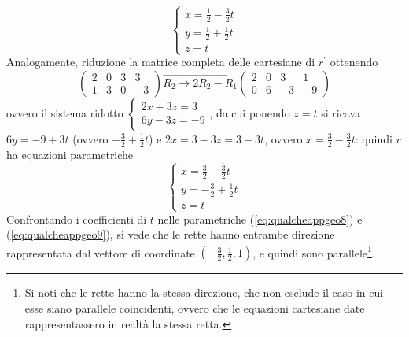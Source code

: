 \begin{oss}
\begin{equation}
    \begin{cases}
      x=\frac{1}{2}-\frac{3}{2}t\\
      y=\frac{1}{2}+\frac{1}{2}t\\
      z=t
    \end{cases}
  \end{equation}
  Analogamente, riduzione la matrice completa delle cartesiane di $r^\prime$ ottenendo
  \begin{equation*}
    \left(
      \begin{array}{ccc|c}
        2 & 0 & 3 & 3 \\
        1 & 3 & 0 & -3
      \end{array}
    \right)\overrightarrow{R_2\to2R_2-R_1}\left(
      \begin{array}{ccc|c}
        2 & 0 & 3 & 1 \\
        0 & 6 & -3 & -9
      \end{array}
    \right)
  \end{equation*}
  ovvero il sistema ridotto $
  \begin{cases}
    2x+3z=3\\
    6y-3z=-9
  \end{cases}
  $, da cui ponendo $z = t$ si ricava $6y=-9+3t$ (ovvero $-\frac{3}{2}+\frac{1}{2}t$) e $2x=3-3z=3-3t$,
  ovvero $x=\frac{3}{2}-\frac{3}{2}t$: quindi $r$ ha equazioni parametriche
  \begin{equation}
    \label{eq:qualcheappgeo9}
    \begin{cases}
      x=\frac{3}{2}-\frac{3}{2}t\\
      y=-\frac{3}{2}+\frac{1}{2}t\\
      z=t
    \end{cases}
  \end{equation}
  Confrontando i coefficienti di $t$ nelle parametriche (\ref{eq:qualcheappgeo8}) e
  (\ref{eq:qualcheappgeo9}), si vede che le rette hanno entrambe direzione rappresentata dal vettore
  di coordinate $\left(-\frac{3}{2},\frac{1}{2},1\right)$, e quindi sono parallele\footnote{Si
    noti che le rette hanno la stessa direzione, che non esclude il caso in cui esse siano parallele
    coincidenti, ovvero che le equazioni cartesiane date rappresentassero in realtà la stessa retta.}.
\end{oss}
